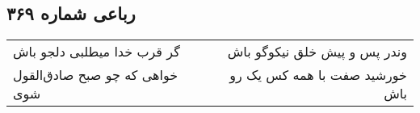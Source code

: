 \begin{center}
\section*{رباعی شماره ۳۶۹}
\label{sec:sh369}
\begin{longtable}{l p{0.5cm} r}
گر قرب خدا میطلبی دلجو باش
&&
وندر پس و پیش خلق نیکوگو باش
\\
خواهی که چو صبح صادق‌القول شوی
&&
خورشید صفت با همه کس یک رو باش
\\
\end{longtable}
\end{center}
